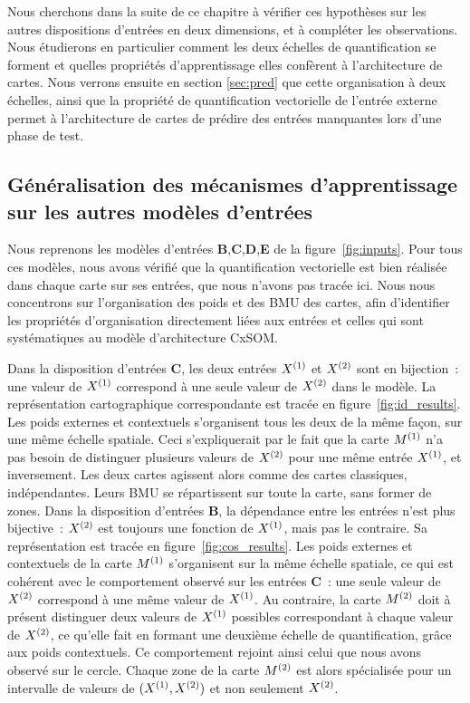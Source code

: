 \documentclass[../main]{subfiles}
\begin{document}
Nous cherchons dans la suite de ce chapitre à vérifier ces hypothèses sur les autres dispositions d'entrées en deux dimensions, et à compléter les observations.
Nous étudierons en particulier comment les deux échelles de quantification se forment et quelles propriétés d'apprentissage elles confèrent à l'architecture de cartes.
Nous verrons ensuite en section \ref{sec:pred} que cette organisation à deux échelles, ainsi que la propriété de quantification vectorielle de l'entrée externe permet à l'architecture de cartes de prédire des entrées manquantes lors d'une phase de test.

\subsection{Généralisation des mécanismes d'apprentissage sur les autres modèles d'entrées}

Nous reprenons les modèles d'entrées \textbf{B},\textbf{C},\textbf{D},\textbf{E} de la figure~\ref{fig:inputs}.
Pour tous ces modèles, nous avons vérifié que la quantification vectorielle est bien réalisée dans chaque carte sur ses entrées, que nous n'avons pas tracée ici.
Nous nous concentrons sur l'organisation des poids et des BMU des cartes, afin d'identifier les propriétés d'organisation directement liées aux entrées et celles qui sont systématiques au modèle d'architecture CxSOM.

Dans la disposition d'entrées \textbf{C}, les deux entrées $X^{({1})}$ et $X^{({2})}$ sont en bijection~: une valeur de $X^{({1})}$ correspond à une seule valeur de $X^{({2})}$ dans le modèle.
La représentation cartographique correspondante est tracée en figure~\ref{fig:id_results}.
Les poids externes et contextuels s'organisent tous les deux de la même façon, sur une même échelle spatiale. Ceci s'expliquerait par le fait que la carte $M^{({1})}$ n'a pas besoin de distinguer plusieurs valeurs de $X^{({2})}$ pour une même entrée $X^{({1})}$, et inversement. Les deux cartes agissent alors comme des cartes classiques, indépendantes. Leurs BMU se répartissent sur toute la carte, sans former de zones.
Dans la disposition d'entrées \textbf{B}, la dépendance entre les entrées n'est plus bijective~: $X^{({2})}$ est toujours une fonction de $X^{({1})}$, mais pas le contraire. Sa représentation est tracée en figure~\ref{fig:cos_results}.
Les poids externes et contextuels de la carte $M^{({1})}$ s'organisent sur la même échelle spatiale, ce qui est cohérent avec le comportement observé sur les entrées \textbf{C}~: une seule valeur de $X^{({2})}$ correspond à une même valeur de $X^{({1})}$.
Au contraire, la carte $M^{({2})}$ doit à présent distinguer deux valeurs de $X^{({1})}$ possibles correspondant à chaque valeur de $X^{({2})}$, ce qu'elle fait en formant une deuxième échelle de quantification, grâce aux poids contextuels. Ce comportement rejoint ainsi celui que nous avons observé sur le cercle. Chaque zone de la carte $M^{({2})}$ est alors spécialisée pour un intervalle de valeurs de $(X^{({1})}, X^{({2})})$ et non seulement $X^{({2})}$.
\end{document}
